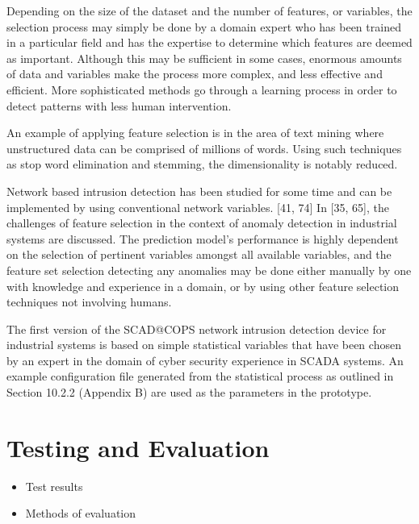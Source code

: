 \documentclass[12pt,]{article}
\begin{document}
Depending on the size of the dataset and the number of features, or
variables, the selection process may simply be done by a domain expert
who has been trained in a particular field and has the expertise to
determine which features are deemed as important. Although this may be
sufficient in some cases, enormous amounts of data and variables make
the process more complex, and less effective and efficient. More
sophisticated methods go through a learning process in order to detect
patterns with less human intervention.

An example of applying feature selection is in the area of text mining
where unstructured data can be comprised of millions of words. Using
such techniques as stop word elimination and stemming, the
dimensionality is notably reduced.

Network based intrusion detection has been studied for some time and can
be implemented by using conventional network variables. {[}41, 74{]} In
{[}35, 65{]}, the challenges of feature selection in the context of
anomaly detection in industrial systems are discussed. The prediction
model's performance is highly dependent on the selection of pertinent
variables amongst all available variables, and the feature set selection
detecting any anomalies may be done either manually by one with
knowledge and experience in a domain, or by using other feature
selection techniques not involving humans.

The first version of the SCAD@COPS network intrusion detection device
for industrial systems is based on simple statistical variables that
have been chosen by an expert in the domain of cyber security experience
in SCADA systems. An example configuration file generated from the
statistical process as outlined in Section 10.2.2 (Appendix B) are used
as the parameters in the prototype.

\pagebreak

\section{Testing and Evaluation}\label{testing-and-evaluation}

\begin{itemize}
\itemsep1pt\parskip0pt
\item
  Test results\\
\item
  Methods of evaluation
\end{itemize}

\pagebreak
\end{document}
